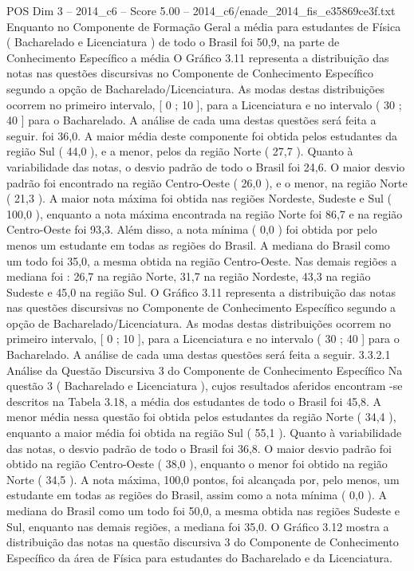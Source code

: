 \begin{textsample}{POS Dim 3 – 2014\_c6 – Score 5.00 – 2014\_c6/enade\_2014\_fis\_e35869ce3f.txt}
Enquanto no Componente de Formação Geral a média para estudantes de Física ( Bacharelado e Licenciatura ) de todo o Brasil foi 50,9, na parte de Conhecimento Específico a média O Gráfico 3.11 representa a distribuição das notas nas questões discursivas no Componente de Conhecimento Específico segundo a opção de Bacharelado/Licenciatura.
As modas destas distribuições ocorrem no primeiro intervalo, [ 0 ; 10 ], para a Licenciatura e no intervalo ( 30 ; 40 ] para o Bacharelado.
A análise de cada uma destas questões será feita a seguir. foi 36,0.
A maior média deste componente foi obtida pelos estudantes da região Sul ( 44,0 ), e a menor, pelos da região Norte ( 27,7 ).
Quanto à variabilidade das notas, o desvio padrão de todo o Brasil foi 24,6.
O maior desvio padrão foi encontrado na região Centro-Oeste ( 26,0 ), e o menor, na região Norte ( 21,3 ).
A maior nota máxima foi obtida nas regiões Nordeste, Sudeste e Sul ( 100,0 ), enquanto a nota máxima encontrada na região Norte foi 86,7 e na região Centro-Oeste foi 93,3.
Além disso, a nota mínima ( 0,0 ) foi obtida por pelo menos um estudante em todas as regiões do Brasil.
A mediana do Brasil como um todo foi 35,0, a mesma obtida na região Centro-Oeste.
Nas demais regiões a mediana foi : 26,7 na região Norte, 31,7 na região Nordeste, 43,3 na região Sudeste e 45,0 na região Sul.
O Gráfico 3.11 representa a distribuição das notas nas questões discursivas no Componente de Conhecimento Específico segundo a opção de Bacharelado/Licenciatura.
As modas destas distribuições ocorrem no primeiro intervalo, [ 0 ; 10 ], para a Licenciatura e no intervalo ( 30 ; 40 ] para o Bacharelado.
A análise de cada uma destas questões será feita a seguir. 3.3.2.1 Análise da Questão Discursiva 3 do Componente de Conhecimento Específico Na questão 3 ( Bacharelado e Licenciatura ), cujos resultados aferidos encontram -se descritos na Tabela 3.18, a média dos estudantes de todo o Brasil foi 45,8.
A menor média nessa questão foi obtida pelos estudantes da região Norte ( 34,4 ), enquanto a maior média foi obtida na região Sul ( 55,1 ).
Quanto à variabilidade das notas, o desvio padrão de todo o Brasil foi 36,8.
O maior desvio padrão foi obtido na região Centro-Oeste ( 38,0 ), enquanto o menor foi obtido na região Norte ( 34,5 ).
A nota máxima, 100,0 pontos, foi alcançada por, pelo menos, um estudante em todas as regiões do Brasil, assim como a nota mínima ( 0,0 ).
A mediana do Brasil como um todo foi 50,0, a mesma obtida nas regiões Sudeste e Sul, enquanto nas demais regiões, a mediana foi 35,0.
O Gráfico 3.12 mostra a distribuição das notas na questão discursiva 3 do Componente de Conhecimento Específico da área de Física para estudantes do Bacharelado e da Licenciatura.

\end{textsample}
